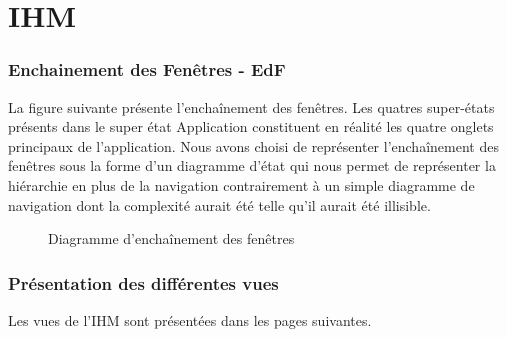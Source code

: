 \part{IHM}
\setcounter{section}{0}

\section{Enchainement des Fenêtres - EdF}

La figure suivante présente l’enchaînement des fenêtres. Les quatres super-états présents dans le super état Application constituent en réalité les quatre onglets principaux de l'application. Nous avons choisi de représenter l’enchaînement des fenêtres sous la forme d'un diagramme d'état qui nous permet de représenter la hiérarchie en plus de la navigation contrairement à un simple diagramme de navigation dont la complexité aurait été telle qu'il aurait été illisible.

\begin{figure}[H]
\noindent{}
\caption{Diagramme d’enchaînement des fenêtres}
\end{figure}

\section{Présentation des différentes vues}
Les vues de l'IHM sont présentées dans les pages suivantes.

